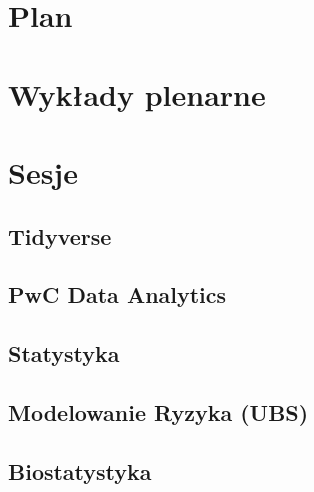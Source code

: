 \documentclass[11pt,twoside,b5paper]{book}
\begin{document}
{\chapter{Plan}

\chapter{Wykłady plenarne}{}

\newpage

\newpage

\newpage

\newpage

\newpage

\newpage

\newpage

\newpage

\newpage


\chapter{Sesje}{\LARGE}
\section{Tidyverse}{}






\section{PwC Data Analytics}


\section{Statystyka}






\section{Modelowanie Ryzyka (UBS)}


\section{Biostatystyka}






}
\end{document}
